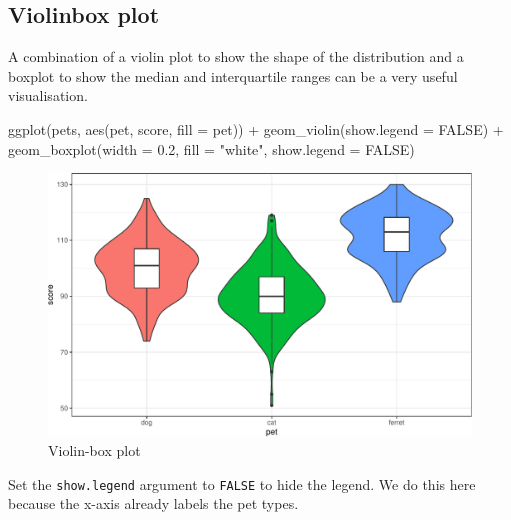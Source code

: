 \documentclass[
  oneside]{book}
\newenvironment{Shaded}{\begin{snugshade}}{\end{snugshade}}
\newcommand{\AttributeTok}[1]{\textcolor[rgb]{0.77,0.63,0.00}{#1}}
\newcommand{\ConstantTok}[1]{\textcolor[rgb]{0.00,0.00,0.00}{#1}}
\newcommand{\FloatTok}[1]{\textcolor[rgb]{0.00,0.00,0.81}{#1}}
\newcommand{\FunctionTok}[1]{\textcolor[rgb]{0.00,0.00,0.00}{#1}}
\newcommand{\NormalTok}[1]{#1}
\newcommand{\SpecialCharTok}[1]{\textcolor[rgb]{0.00,0.00,0.00}{#1}}
\newcommand{\StringTok}[1]{\textcolor[rgb]{0.31,0.60,0.02}{#1}}
\begin{document}
\hypertarget{violinbox-plot}{%
\subsection{Violinbox plot}\label{violinbox-plot}}

A combination of a violin plot to show the shape of the distribution and a boxplot to show the median and interquartile ranges can be a very useful visualisation.

\begin{Shaded}
\begin{Highlighting}[]
\FunctionTok{ggplot}\NormalTok{(pets, }\FunctionTok{aes}\NormalTok{(pet, score, }\AttributeTok{fill =}\NormalTok{ pet)) }\SpecialCharTok{+}
  \FunctionTok{geom\_violin}\NormalTok{(}\AttributeTok{show.legend =} \ConstantTok{FALSE}\NormalTok{) }\SpecialCharTok{+} 
  \FunctionTok{geom\_boxplot}\NormalTok{(}\AttributeTok{width =} \FloatTok{0.2}\NormalTok{, }\AttributeTok{fill =} \StringTok{"white"}\NormalTok{, }
               \AttributeTok{show.legend =} \ConstantTok{FALSE}\NormalTok{)}
\end{Highlighting}
\end{Shaded}

\begin{figure}

{\centering \includegraphics[width=0.9\linewidth]{images/violinbox-1} 

}

\caption{Violin-box plot}\label{fig:violinbox}
\end{figure}

\begin{info}
Set the \texttt{show.legend} argument to \texttt{FALSE} to hide the legend. We do this here because the x-axis already labels the pet types.

\end{info}
\end{document}
